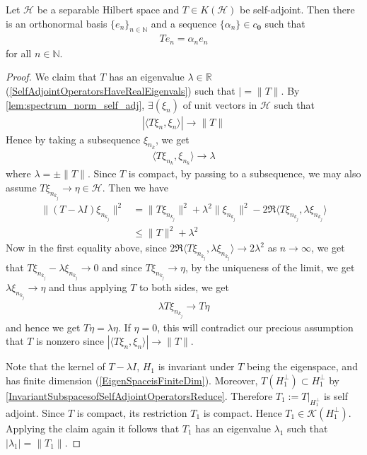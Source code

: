 \begin{theorem}
  \label{SpectralTheoremforCompactSAOperators}
  Let $\mathcal{H}$ be a separable Hilbert space and $T \in K(\mathcal{H})$ be
  self-adjoint. Then there is an orthonormal basis $ \{ e_n \}_{n \in
  \mathbb{N}}$ and a sequence $\{\alpha_n\} \in c_{\textbf{0}}$ such that
  \begin{align*}
    T e_n = \alpha_n e_n
  \end{align*}
  for all $n \in \mathbb{N}$.
\end{theorem}
\begin{proof}
  We claim that $T$ has an eigenvalue $\lambda \in \mathbb{R}$
  (\autoref{SelfAdjointOperatorsHaveRealEigenvals}) such
  that $| = \|T\|$. By   \autoref{lem:spectrum_norm_self_adj}, $\exists
  (\xi_n)$ of unit vectors in $\mathcal{H}$ such that
  \begin{align*}
    |\langle T  \xi_n , \xi_n \rangle| \to \|T\|
  \end{align*}
  Hence by taking a subsequence $\xi_{n_k}$, we get
  \begin{align*}
    \langle T \xi_{n_k} ,  \xi_{n_k} \rangle \to \lambda
  \end{align*}
  where $\lambda = \pm \|T\|$. Since $T$ is compact, by passing to a
  subsequence, we may also assume $T \xi_{n_{k_j}} \to \eta \in \mathcal{H}$.
  Then we have
  \begin{align*}
    \|(T - \lambda I)\xi_{n_{k_j}}\|^2 &= \|T \xi_{n_{k_j}}\|^2 +
    \lambda^2 \|\xi_{n_{k_j}}\|^2 - 2 \Re \langle T \xi_{n_{k_j}}
    , \lambda \xi_{n_{k_j}}  \rangle  \\
    & \le \|T\|^2 + \lambda^2
  \end{align*}
  Now in the first equality above, since $2 \Re \langle T \xi_{n_{k_j}}
  ,\lambda\xi_{n_{k_j}}  \rangle \to 2\lambda^2$ as $n \to \infty$, we get
  that $T \xi_{n_{k_j}} - \lambda\xi_{n_{k_j}} \to 0$ and since $T \xi_{n_{k_j}}
  \to \eta$, by the uniqueness of the limit, we get $\lambda
  \xi_{n_{k_j}} \to \eta$ and thus applying $T$ to both sides, we get
  \begin{align*}
    \lambda T \xi_{n_{k_j}} \to  T \eta
  \end{align*}
  and hence we get $T \eta = \lambda \eta$. If $\eta= 0$, this will
  contradict our precious assumption that $T$ is nonzero since
  $|\langle T \xi_n , \xi_n \rangle | \to \|T\|$.

  Note that the kernel of $T - \lambda I$, $H_1$ is invariant under
  $T$ being the eigenspace, and has finite dimension
  (\autoref{EigenSpaceisFiniteDim}).
  Moreover, $T(H_1^\perp) \subset H_1^\perp$ by
  \autoref{InvariantSubspacesofSelfAdjointOperatorsReduce}.
  Therefore $T_1:= T|_{H_1^\perp}$ is
  self adjoint. Since $T$ is compact, its restriction $T_1$ is
  compact. Hence $T_1 \in \mathcal{K}(H_1^\perp)$. Applying the claim again it
  follows that $T_1$ has an eigenvalue $\lambda_1$ such that
  $|\lambda_1| = \|T_1\|$.


\end{proof}
